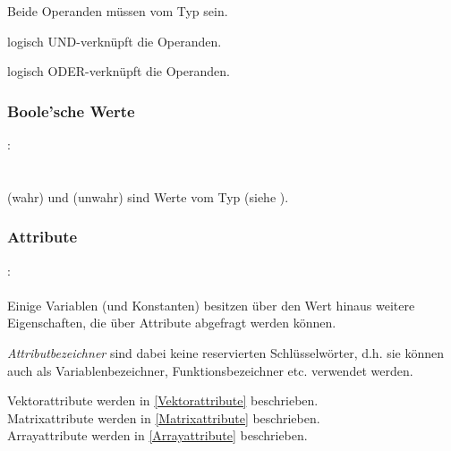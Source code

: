 
Beide Operanden müssen vom Typ  sein.

\op{\&\&} logisch UND-verknüpft die Operanden.

\op{||} logisch ODER-verknüpft die Operanden.


\subsubsection{Boole'sche Werte}\label{Boole'sche Werte}
:\label{asdr_konst_bool}\\
\hspace*{1cm}\glq{}\grq \\
\hspace*{1cm}\glq{}\grq \\

 (wahr) und  (unwahr) sind Werte vom Typ  (siehe ).


\subsubsection{Attribute}\label{Attribute}
:\label{attribut}\\
\hspace*{1cm} \\


Einige Variablen (und Konstanten) besitzen über den Wert hinaus weitere Eigenschaften, die
über Attribute abgefragt werden können.

\emph{Attributbezeichner} sind dabei keine reservierten
Schlüsselwörter, d.h. sie können auch als Variablenbezeichner, Funktionsbezeichner etc.
verwendet werden.

Vektorattribute werden in \ref{Vektorattribute} beschrieben.\\
Matrixattribute werden in \ref{Matrixattribute} beschrieben.\\
Arrayattribute werden in \ref{Arrayattribute} beschrieben.\\


